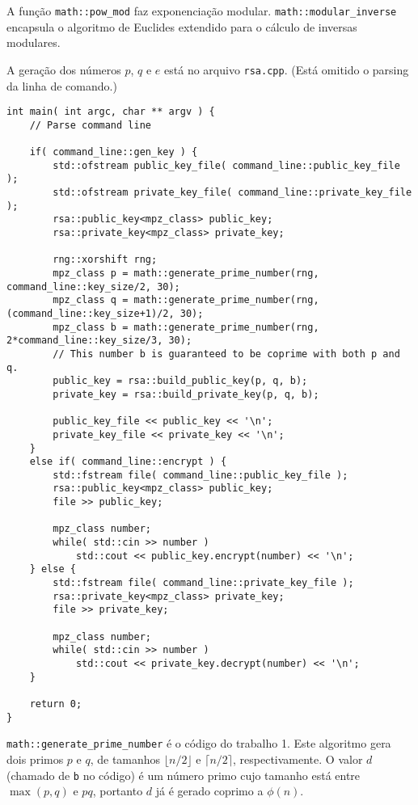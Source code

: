 \documentclass{article}
\begin{document}
A função \verb"math::pow_mod" faz exponenciação modular.
\verb"math::modular_inverse" encapsula o algoritmo de Euclides extendido
para o cálculo de inversas modulares.

A geração dos números $p$, $q$ e $e$ está no arquivo \verb"rsa.cpp".
(Está omitido o parsing da linha de comando.)

\begin{verbatim}
int main( int argc, char ** argv ) {
    // Parse command line

    if( command_line::gen_key ) {
        std::ofstream public_key_file( command_line::public_key_file );
        std::ofstream private_key_file( command_line::private_key_file );
        rsa::public_key<mpz_class> public_key;
        rsa::private_key<mpz_class> private_key;

        rng::xorshift rng;
        mpz_class p = math::generate_prime_number(rng, command_line::key_size/2, 30);
        mpz_class q = math::generate_prime_number(rng, (command_line::key_size+1)/2, 30);
        mpz_class b = math::generate_prime_number(rng, 2*command_line::key_size/3, 30);
        // This number b is guaranteed to be coprime with both p and q.
        public_key = rsa::build_public_key(p, q, b);
        private_key = rsa::build_private_key(p, q, b);

        public_key_file << public_key << '\n';
        private_key_file << private_key << '\n';
    }
    else if( command_line::encrypt ) {
        std::fstream file( command_line::public_key_file );
        rsa::public_key<mpz_class> public_key;
        file >> public_key;

        mpz_class number;
        while( std::cin >> number )
            std::cout << public_key.encrypt(number) << '\n';
    } else {
        std::fstream file( command_line::private_key_file );
        rsa::private_key<mpz_class> private_key;
        file >> private_key;

        mpz_class number;
        while( std::cin >> number )
            std::cout << private_key.decrypt(number) << '\n';
    }

    return 0;
}
\end{verbatim}

\verb"math::generate_prime_number" é o código do trabalho 1.
Este algoritmo gera dois primos $p$ e $q$,
de tamanhos $\lfloor n/2 \rfloor$ e $\lceil n/2 \rceil$,
respectivamente.
O valor $d$ (chamado de \verb"b" no código)
é um número primo cujo tamanho está entre $\max(p, q)$ e $pq$,
portanto $d$ já é gerado coprimo a $\phi(n)$.
\end{document}
